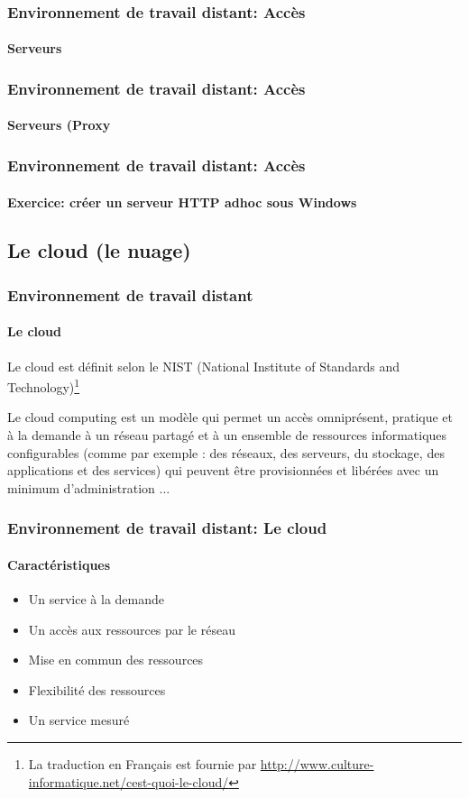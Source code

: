 \documentclass{beamer}
\begin{document}
\begin{frame}
\frametitle{Environnement de travail distant: Accès}
\framesubtitle{Serveurs}



\end{frame}

\begin{frame}
\frametitle{Environnement de travail distant: Accès}
\framesubtitle{Serveurs (Proxy}



\end{frame}


\begin{frame}
\frametitle{Environnement de travail distant: Accès}
\framesubtitle{Exercice: créer un serveur HTTP adhoc sous Windows}




\end{frame}


\subsection{Le cloud (le nuage)}

\begin{frame}
\frametitle{Environnement de travail distant}
\framesubtitle{Le cloud}

Le cloud est définit selon le NIST (National Institute of Standards and Technology)\footnote{La traduction en Français est fournie par \url{http://www.culture-informatique.net/cest-quoi-le-cloud/}}
\begin{definition}
	Le cloud computing est un modèle qui permet un accès omniprésent, pratique et à la demande à un réseau partagé et à un ensemble de ressources informatiques configurables (comme par exemple : des réseaux, des serveurs, du stockage, des applications et des services) qui peuvent être provisionnées et libérées avec un minimum d’administration ...
\end{definition}

\end{frame}

\begin{frame}
\frametitle{Environnement de travail distant: Le cloud}
\framesubtitle{Caractéristiques}

\begin{itemize}
	\item Un service à la demande
	\item Un accès aux ressources par le réseau
	\item Mise en commun des ressources
	\item Flexibilité des ressources
	\item Un service mesuré
\end{itemize}


\end{frame}
\end{document}
